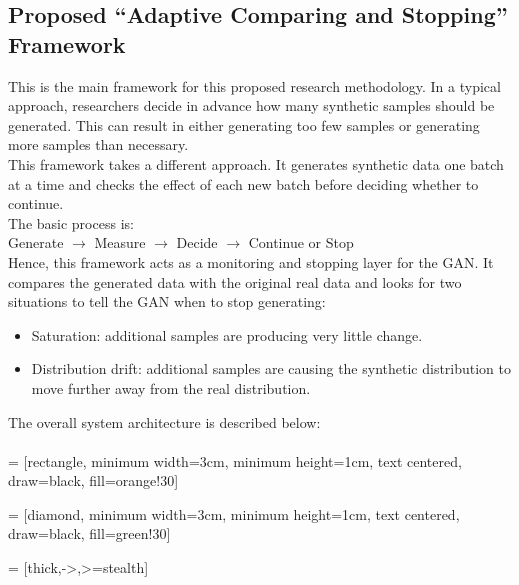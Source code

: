 \documentclass[12pt,a4paper]{report}
\begin{document}
\begin{justify}
\subsection{Proposed ``Adaptive Comparing and Stopping'' Framework}
This is the main framework for this proposed research methodology. In a typical approach, researchers decide in advance how many synthetic samples should be generated. This can result in either generating too few samples or generating more samples than necessary. \\

\noindent This framework takes a different approach. It generates synthetic data one batch at a time and checks the effect of each new batch before deciding whether to continue. \\

\noindent The basic process is: \\

Generate $\rightarrow$ Measure $\rightarrow$ Decide $\rightarrow$ Continue or Stop \\

\noindent Hence, this framework acts as a monitoring and stopping layer for the GAN. It compares the generated data with the original real data and looks for two situations to tell the GAN when to stop generating:

\begin{itemize}
    \item Saturation: additional samples are producing very little change.
    \item Distribution drift: additional samples are causing the synthetic distribution to move further away from the real distribution.
\end{itemize}

\noindent The overall system architecture is described below: \\ \\

 = [rectangle, minimum width=3cm,
minimum height=1cm, text centered, draw=black, fill=orange!30]

 = [diamond, minimum width=3cm,
minimum height=1cm, text centered, draw=black, fill=green!30]

 = [thick,->,>=stealth]


\end{justify}
\end{document}
